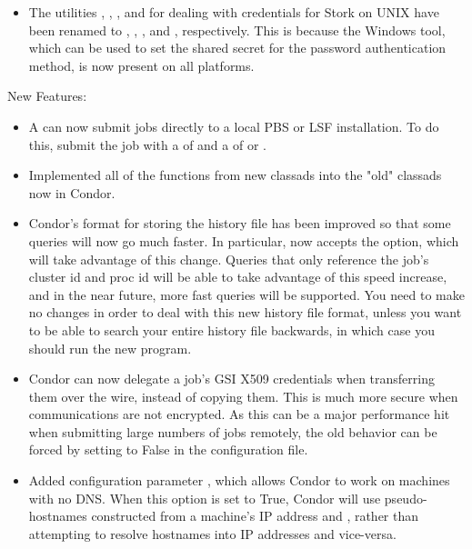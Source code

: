 \begin{itemize}
\item The utilities , ,
, and  for dealing with
credentials for Stork on UNIX have been renamed to
, , , and
, respectively. This is because the Windows
 tool, which can be used to set the shared secret
for the password authentication method, is now present on all
platforms.

\end{itemize}


\noindent New Features:

\begin{itemize}

\item A  can now submit jobs directly to a local PBS
or LSF installation. To do this, submit the job with a
 of  and a
 of  or .

\item Implemented all of the functions from new classads into the
"old" classads now in Condor.

\item Condor's format for storing the history file has been improved
so that some queries will now go much faster. In particular,
 now accepts the  option, which will take
advantage of this change. Queries that only reference the job's
cluster id and proc id will be able to take advantage of this speed
increase, and in the near future, more fast queries will be
supported. You need to make no changes in order to deal with this new
history file format, unless you want to be able to search your entire
history file backwards, in which case you should run the new
 program.

\item Condor can now delegate a job's GSI X509 credentials when
transferring them over the wire, instead of copying them. This is
much more secure when communications are not encrypted. As this can
be a major performance hit when submitting large numbers of jobs
remotely, the old behavior can be forced by setting
 to False in the configuration
file.

\item Added configuration parameter , which allows Condor
to work on machines with no DNS. When this option is set to True, Condor
will use pseudo-hostnames constructed from a machine's IP address and
, rather than attempting to resolve hostnames
into IP addresses and vice-versa.


\end{itemize}
